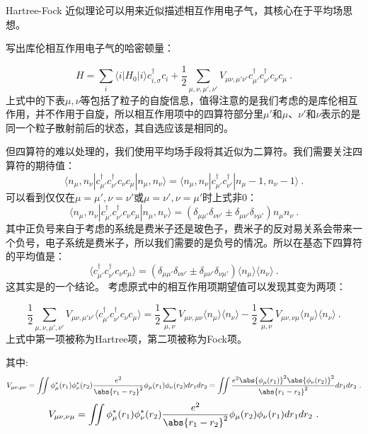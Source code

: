 
Hartree-Fock 近似理论可以用来近似描述相互作用电子气，其核心在于平均场思想。

写出库伦相互作用电子气的哈密顿量：

$$H=\sum\limits_{i}\langle i|H_0|i\rangle c_{i,\sigma}^\dagger c_{i}+\frac{1}{2}\sum\limits_{\mu ,\nu,\mu', \nu'}V_{\mu \nu,\mu' \nu'}c_{\mu'}^\dagger c_{\nu'}^\dagger c_{\nu} c_{\mu}~. $$
上式中的下表$\mu,\nu$等包括了粒子的自旋信息，值得注意的是我们考虑的是库伦相互作用，并不作用于自旋，所以相互作用项中的四算符部分里$\mu'$和$\mu$、$\nu'$和$\nu$表示的是同一个粒子散射前后的状态，其自选应该是相同的。

但四算符的难以处理的，我们使用平均场手段将其近似为二算符。我们需要关注四算符的期待值：
$$
\langle n_\mu, n_\nu |c_{\mu'}^\dagger c_{\nu'}^\dagger c_{\nu} c_{\mu} |n_\mu ,n_\nu \rangle = \langle n_\mu, n_\nu |c_{\mu'}^\dagger c_{\nu'}^\dagger |n_\mu-1 ,n_\nu-1 \rangle~.
$$
可以看到仅仅在$\mu=\mu',\nu=\nu'$或$\mu=\nu',\nu=\mu'$时上式非0：
$$\langle n_\mu, n_\nu |c_{\mu'}^\dagger c_{\nu'}^\dagger c_{\nu} c_{\mu} |n_\mu ,n_\nu \rangle = \left(\delta_{\mu\mu'}\delta_{\nu\nu'}\pm \delta_{\mu\nu'}\delta_{\nu\mu'}\right)n_\mu n_\nu~.$$
其中正负号来自于考虑的系统是费米子还是玻色子，费米子的反对易关系会带来一个负号，电子系统是费米子，所以我们需要的是负号的情况。所以在基态下四算符的平均值是：
\begin{equation}\label{eq_HFock_1}
\langle c_{\mu'}^\dagger c_{\nu'}^\dagger c_{\nu} c_{\mu} \rangle = \left(\delta_{\mu\mu'}\delta_{\nu\nu'}\pm \delta_{\mu\nu'}\delta_{\nu\mu'}\right)\langle n_\mu\rangle \langle n_\nu\rangle~.
\end{equation}
这其实是的一个结论。
考虑原式中的相互作用项期望值可以发现其变为两项：

$$\frac{1}{2}\sum\limits_{\mu ,\nu,\mu', \nu'}V_{\mu \nu,\mu' \nu'}\langle c_{\mu'}^\dagger c_{\nu'}^\dagger c_{\nu} c_{\mu}\rangle=\frac{1}{2}\sum\limits_{\mu,\nu}V_{\mu\nu,\mu\nu}\langle n_\mu\rangle \langle n_\nu\rangle-\frac{1}{2}\sum\limits_{\mu,\nu}V_{\mu\nu,\nu\mu}\langle n_\mu\rangle \langle n_\nu\rangle~.$$
上式中第一项被称为Hartree项，第二项被称为Fock项。

其中:
$$V_{\mu\nu,\mu\nu}=\iint \phi_\mu^*(r_1)\phi_\nu^*(r_2)\frac{e^2}{\abs{r_1-r_2}^2}\phi_\mu(r_1)\phi_\nu(r_2)dr_1dr_2=\iint \frac{e^2\abs{\phi_\mu(r_1)}^2\abs{\phi_\nu(r_2)}^2}{\abs{r_1-r_2}^2}dr_1dr_2~.$$
$$V_{\mu\nu,\nu\mu}=\iint \phi_\mu^*(r_1)\phi_\nu^*(r_2)\frac{e^2}{\abs{r_1-r_2}^2}\phi_\mu(r_2)\phi_\nu(r_1)dr_1dr_2~.$$

